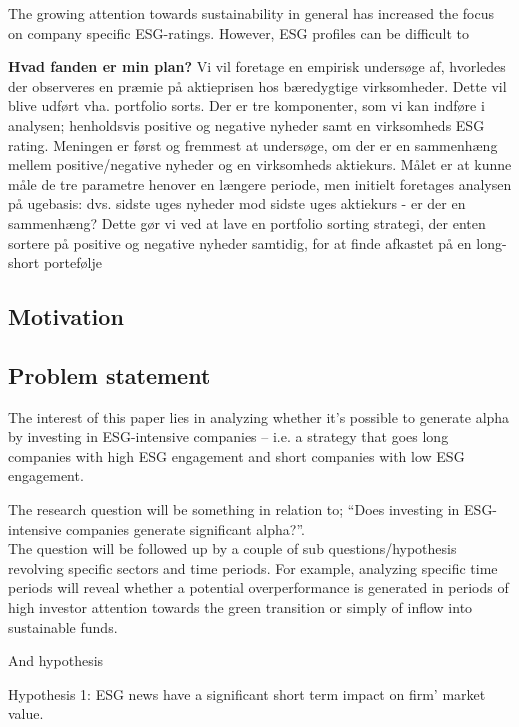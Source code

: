 The growing attention towards sustainability in general has increased the focus on company specific ESG-ratings. However, ESG profiles can be difficult to


\textbf{Hvad fanden er min plan?}
Vi vil foretage en empirisk undersøge af, hvorledes der observeres en præmie på aktieprisen hos bæredygtige virksomheder. Dette vil blive udført vha. portfolio sorts. Der er tre komponenter, som vi kan indføre i analysen; henholdsvis positive og negative nyheder samt en virksomheds ESG rating. Meningen er først og fremmest at undersøge, om der er en sammenhæng mellem positive/negative nyheder og en virksomheds aktiekurs. Målet er at kunne måle de tre parametre henover en længere periode, men initielt foretages analysen på ugebasis: dvs. sidste uges nyheder mod sidste uges aktiekurs -  er der en sammenhæng? Dette gør vi ved at lave en portfolio sorting strategi, der enten sortere på positive og negative nyheder samtidig, for at finde afkastet på en long-short portefølje 





\subsection{Motivation}

\subsection{Problem statement}

The interest of this paper lies in analyzing whether it’s possible to generate alpha by investing in ESG-intensive companies – i.e.
a strategy that goes long companies with high ESG engagement and short companies with low ESG engagement. 

The research question will be something in relation to; “Does investing in ESG-intensive companies generate significant alpha?”. \\

The question will be followed up by a couple of sub questions/hypothesis revolving specific sectors and time periods. For example, analyzing specific time periods will reveal whether a potential overperformance is generated in periods of high investor attention towards the green transition or simply of inflow into sustainable funds. 

And hypothesis

Hypothesis 1:
ESG news have a significant short term impact on firm' market value.

